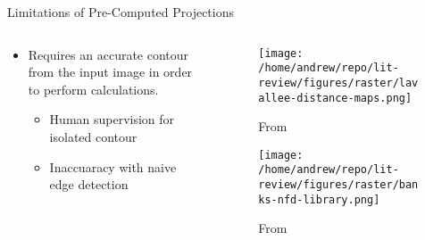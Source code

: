 \documentclass[presentation, aspectratio=1610]{beamer}
\begin{document}
\begin{frame}[label={sec:orga0fba7b}]{Limitations of Pre-Computed Projections}
\begin{columns}
\begin{column}{0.5\columnwidth}
\begin{itemize}
\item Requires an accurate contour from the input image in order to perform calculations.
\begin{itemize}
\item Human supervision for isolated contour
\item Inaccuaracy with naive edge detection
\end{itemize}
\end{itemize}
\end{column}
\begin{column}{0.6\columnwidth}
\begin{figure}[htbp]
\centering
\texttt{[image: /home/andrew/repo/lit-review/figures/raster/lavallee-distance-maps.png]}
\caption{From \autocite{lavalleeRecoveringPositionOrientation1995}}
\end{figure}
\vspace{-0.25in}
\begin{figure}[htbp]
\centering
\texttt{[image: /home/andrew/repo/lit-review/figures/raster/banks-nfd-library.png]}
\caption{From \autocite{banksAccurateMeasurementThreedimensional1996}}
\end{figure}
\end{column}
\end{columns}
\end{frame}
\end{document}
